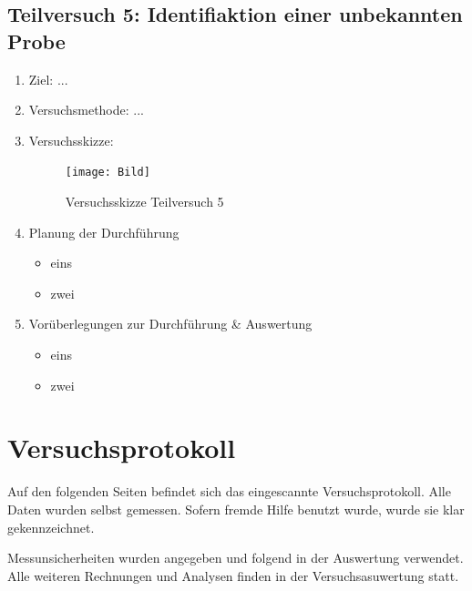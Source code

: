 \documentclass{article}
\begin{document}
\subsection{Teilversuch 5: Identifiaktion einer unbekannten Probe}
\begin{enumerate}[label = (\Roman*)]
    \item Ziel: ...
    
    \item Versuchsmethode: ...
    
    \item Versuchsskizze:
    
        \begin{figure}[H]
        \centering
        \texttt{[image: Bild]}
        \caption{Versuchsskizze Teilversuch 5}
        \end{figure}

    \item Planung der Durchführung
        \begin{itemize}
            \item eins
            \item zwei
        \end{itemize}

    \item Vorüberlegungen zur Durchführung \& Auswertung
        \begin{itemize}
            \item eins
            \item zwei
        \end{itemize}
    
\end{enumerate}

\newpage

\section{Versuchsprotokoll}

Auf den folgenden Seiten befindet sich das eingescannte Versuchsprotokoll. Alle Daten wurden selbst gemessen. Sofern fremde Hilfe benutzt wurde, wurde sie klar gekennzeichnet.

Messunsicherheiten wurden angegeben und folgend in der Auswertung verwendet. Alle weiteren Rechnungen und Analysen finden in der Versuchsasuwertung statt.



\newpage
\end{document}
